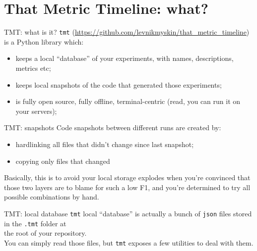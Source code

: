 \documentclass[aspectratio=169,xcolor={dvipsnames}]{beamer}
\begin{document}
  \section{That Metric Timeline: what?}
  \begin{frame}{TMT: what is it?}
    \texttt{tmt} (\url{https://github.com/levnikmyskin/that_metric_timeline}) is a Python library which:
    \begin{itemize}
      \item keeps a local ``database'' of your experiments, with names, descriptions, metrics etc;
      \item keeps local snapshots of the code that generated those experiments;
      \item is fully open source, fully offline, terminal-centric (read, you can run it on your servers);
    \end{itemize}
  \end{frame}
  \begin{frame}{TMT: snapshots}
    Code snapshots between different runs are created by:
    \begin{itemize}
      \item hardlinking all files that didn't change since last snapshot;
      \item copying only files that changed
    \end{itemize}
    Basically, this is to avoid your local storage explodes when you're convinced that 
    \\those two layers are to blame for such a low F1, and you're determined to try all possible 
    combinations by hand.
  \end{frame}
  \begin{frame}{TMT: local database}
    \texttt{tmt} local ``database'' is actually a bunch of \texttt{json} files stored
    in the \texttt{.tmt} folder at\\the root of your repository.\\
    You can simply read those files, but \texttt{tmt} exposes a few utilities to deal with them.
  \end{frame}
\end{document}
